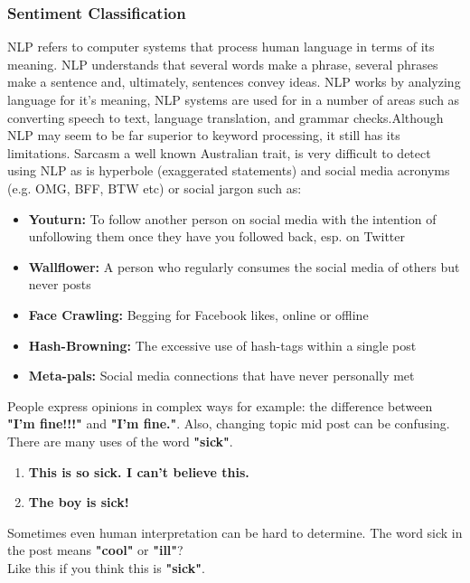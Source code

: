 \documentclass[preprint,12pt]{elsarticle}
\begin{document}
\subsubsection{\textbf{Sentiment Classification}}
NLP refers to computer systems that process human language in terms of its meaning. NLP understands that several words make a phrase, several phrases make a sentence and, ultimately, sentences convey ideas. NLP works by analyzing language for it's meaning, NLP systems are used for in a number of areas such as converting speech to text, language translation, and grammar checks.Although NLP may seem to be far superior to keyword processing, it still has its limitations. Sarcasm a well known Australian trait, is very difficult to detect using NLP as is hyperbole (exaggerated statements) and social media acronyms (e.g. OMG, BFF, BTW etc) or social jargon such as:\\
\begin{itemize}
\item \textbf{Youturn:} To follow another person on social media with the intention of unfollowing them once they have you followed back, esp. on Twitter
\item \textbf{Wallflower:} A person who regularly consumes the social media of others but never posts
\item \textbf{Face Crawling:} Begging for Facebook likes, online or offline
\item \textbf{Hash-Browning:} The excessive use of hash-tags within a single post
\item \textbf{Meta-pals:} Social media connections that have never personally met\\
\end{itemize}
People express opinions in complex ways for example: the difference between \textbf{"I'm fine!!!"} and \textbf{"I'm fine."}. Also, changing topic mid post can be confusing. There are many uses of the word \textbf{"sick"}.
\begin{enumerate}
\item \textbf{This is so sick. I can’t believe this.}
\item \textbf{The boy is sick!}
\end{enumerate}
Sometimes even human interpretation can be hard to determine. The word sick in the post means \textbf{"cool"} or \textbf{"ill"}?\\
Like this if you think this is \textbf{"sick"}.\\
\end{document}
